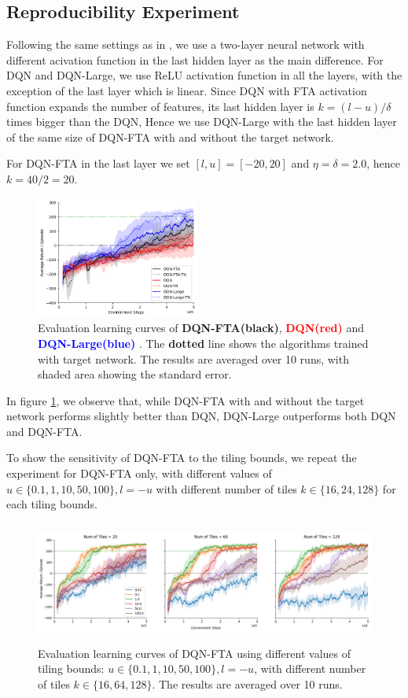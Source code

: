 \documentclass{article}
\begin{document}
\subsection{Reproducibility Experiment} \label{sub-sec:reproduc experiments}
Following the same settings as in \cite{pan2019fuzzy}, we use a two-layer neural network with different acivation function in the last hidden layer as the main difference. For DQN and DQN-Large, we use ReLU activation function in all the layers, with the exception of the last layer which is linear.
Since DQN with FTA activation function expands the number of features, its last hidden layer is $k = (l-u)/\delta$ times bigger than the DQN, Hence we use DQN-Large with the last hidden layer of the same size of DQN-FTA with and without the target network.

For DQN-FTA in the last layer we set $[l, u] = [-20, 20]$ and $\eta = \delta = 2.0$, hence $k = 40/2 = 20$.


\begin{figure}[h]
    \centering
    \includegraphics[height=4cm]{ftavrelu.png}
    \caption{Evaluation learning curves of {\bf DQN-FTA(black)}, {\textcolor{red} {\bf DQN(red)}} and {\textcolor{blue} {\bf DQN-Large(blue)} }. The {\bf dotted} line shows the algorithms trained with target network. The results are averaged over 10 runs, with shaded area showing the standard error.}
    \label{fig:ftavrelu}
\end{figure}



In figure \ref{fig:ftavrelu}, we observe that, while DQN-FTA with and without the target network performs slightly better than DQN, DQN-Large outperforms both DQN and DQN-FTA.

To show the sensitivity of DQN-FTA to the tiling bounds, we repeat the experiment for DQN-FTA only, with different values of $u \in \{0.1,1,10,50,100\}, l = -u$ with different number of tiles $k \in \{16, 24, 128\}$ for each tiling bounds.

\begin{figure}[h]
    \centering
    \includegraphics[height=4cm]{sweepfta.png}
    \caption{Evaluation learning curves of DQN-FTA using different values of tiling bounds: $u \in \{0.1, 1, 10, 50, 100\}, l = -u$, with different number of tiles $k \in \{16, 64, 128\}$. The results are averaged over 10 runs.}
    \label{fig:sweepfta}
\end{figure}
\end{document}
